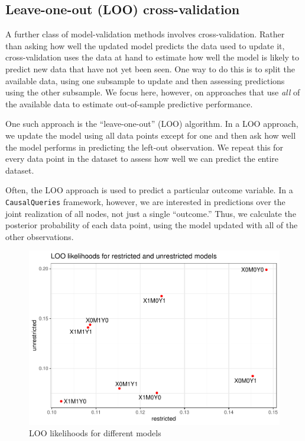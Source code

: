 \documentclass[
  12pt,
]{book}
\begin{document}
\hypertarget{leave-one-out-loo-cross-validation}{%
\subsection{Leave-one-out (LOO) cross-validation}\label{leave-one-out-loo-cross-validation}}

A further class of model-validation methods involves cross-validation. Rather than asking how well the updated model predicts the data used to update it, cross-validation uses the data at hand to estimate how well the model is likely to predict new data that have not yet been seen. One way to do this is to split the available data, using one subsample to update and then assessing predictions using the other subsample. We focus here, however, on approaches that use \emph{all} of the available data to estimate out-of-sample predictive performance.

One such approach is the ``leave-one-out'' (LOO) algorithm. In a LOO approach, we update the model using all data points except for one and then ask how well the model performs in predicting the left-out observation. We repeat this for every data point in the dataset to assess how well we can predict the entire dataset.

Often, the LOO approach is used to predict a particular outcome variable. In a \texttt{CausalQueries} framework, however, we are interested in predictions over the joint realization of all nodes, not just a single ``outcome.'' Thus, we calculate the posterior probability of each data point, using the model updated with all of the other observations.

\begin{figure}

{\centering \includegraphics{ii_files/figure-latex/loolik1-1} 

}

\caption{LOO likelihoods for different models}\label{fig:loolik1}
\end{figure}
\end{document}
